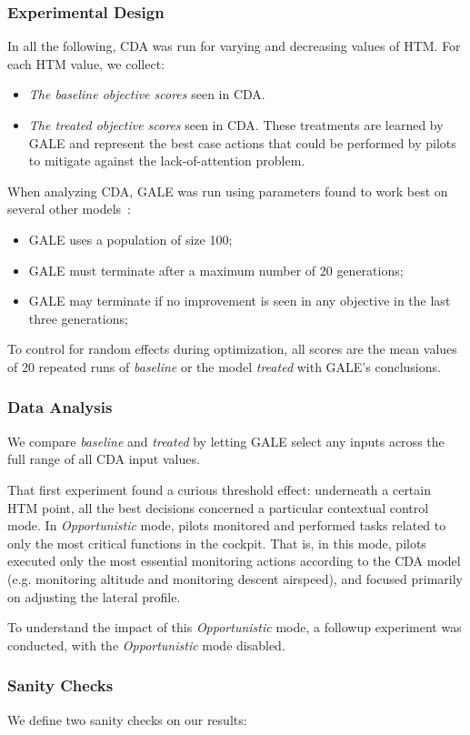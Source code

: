 \documentclass[journal]{IEEEtran}
\newcommand{\bi}{\begin{itemize}}
\newcommand{\ei}{\end{itemize}}
\begin{document}
\subsubsection{Experimental Design}

In all the following, CDA was run for varying and decreasing values of HTM.
For each HTM value, we collect:
\bi
\item {\em The  baseline objective scores} seen in CDA. 
\item {\em The treated objective scores} seen in CDA. These treatments are learned
by GALE and represent the best case actions that could be performed by pilots
to mitigate against the lack-of-attention problem.
\ei

When analyzing CDA, GALE was run using  parameters found to work best on several other models~\cite{krallphd}:
\bi
\item GALE uses a population of size 100;
\item GALE must  terminate after a maximum number of 20 generations;
\item GALE may terminate if no improvement is seen in any objective in the last three generations;
\ei
To control for random effects during optimization, all scores are the mean values of 20 repeated runs of {\em baseline} or  the model {\em treated} with GALE's conclusions.

\subsubsection{Data Analysis}
We  compare {\em baseline} and {\em treated} by letting GALE select any inputs across the full range of all CDA input values.
 
That first experiment found a curious threshold effect: underneath a certain HTM point, all the best decisions concerned a particular contextual control mode.  
In  {\em Opportunistic} mode, pilots monitored and performed tasks related to only the most critical functions in the cockpit. 
That is, in this mode, pilots executed only the most essential monitoring actions according to the CDA model (e.g. monitoring altitude and monitoring descent airspeed), and focused primarily on adjusting the lateral profile.  
 

To  understand the impact of this {\em Opportunistic} mode, a followup  
experiment   was conducted,  with the {\em Opportunistic} mode  disabled.

\subsubsection{Sanity Checks}
We define two  sanity checks on our results:
\end{document}
